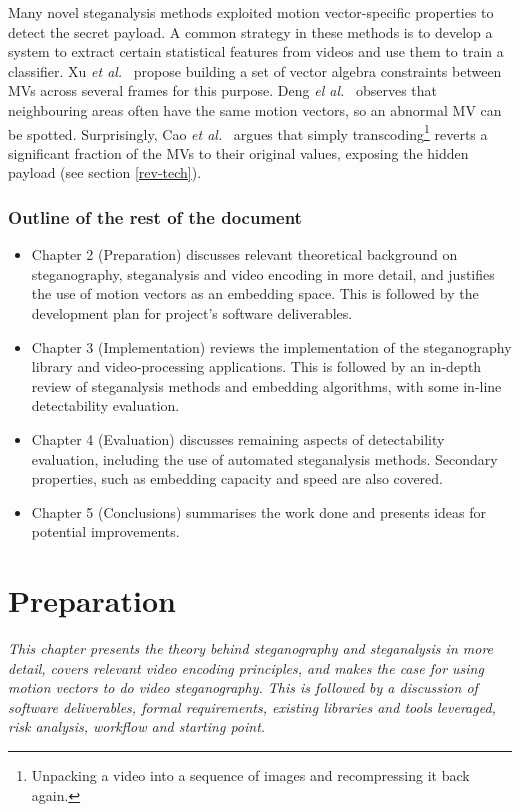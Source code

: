 \documentclass[12pt,british,twoside,notitlepage,usenames,dvipsnames,hypens,final]{report}
\numberwithin{equation}{section}
\numberwithin{figure}{section}
\begin{document}
Many novel steganalysis methods exploited motion vector-specific properties to detect the secret payload. A common strategy in these methods is to develop a system to extract certain statistical features from videos and use them to train a classifier. Xu \emph{et al.}~\cite{xu2013video} propose building a set of vector algebra constraints between MVs across several frames for this purpose. Deng \emph{el al.}~\cite{deng2012digital} observes that neighbouring areas often have the same motion vectors, so an abnormal MV can be spotted. Surprisingly, Cao \emph{et al.}~\cite{cao2012video} argues that simply transcoding\footnote{Unpacking a video into a sequence of images and recompressing it back again.} reverts a significant fraction of the MVs to their original values, exposing the hidden payload (see section \ref{rev-tech}).

\subsection*{Outline of the rest of the document}
\begin{itemize}
\item Chapter 2 (Preparation) discusses relevant theoretical background on steganography, steganalysis and video encoding in more detail, and justifies the use of motion vectors as an embedding space. This is followed by the development plan for project's software deliverables. 
\item Chapter 3 (Implementation) reviews the implementation of the steganography library and video-processing applications. This is followed by an in-depth review of steganalysis methods and embedding algorithms, with some in-line detectability evaluation.
\item Chapter 4 (Evaluation) discusses remaining aspects of detectability evaluation, including the use of automated steganalysis methods. Secondary properties, such as embedding capacity and speed are also covered.
\item Chapter 5 (Conclusions) summarises the work done and presents ideas for potential improvements.
\end{itemize}

\cleardoublepage
\chapter{Preparation}

\textit{This chapter presents the theory behind steganography and steganalysis in more detail, covers relevant video encoding principles, and makes the case for using motion vectors to do video steganography. This is followed by a discussion of software deliverables, formal requirements, existing libraries and tools leveraged, risk analysis, workflow and starting point.}
\end{document}
